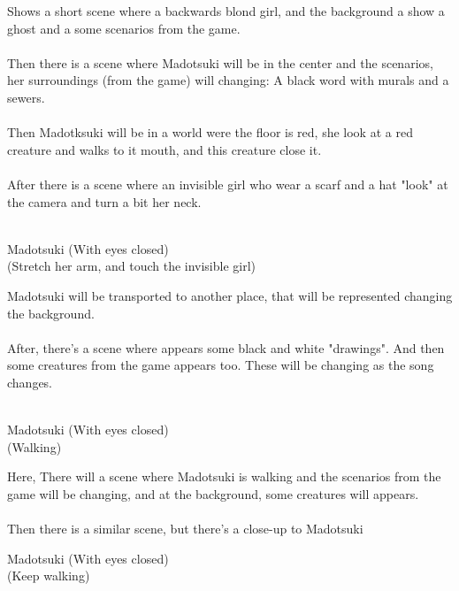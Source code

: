 \documentclass{screenplay}
\begin{document}
	Shows a short scene where a backwards blond girl, and the background a show a ghost and a some scenarios from the game.\\~\\
	
	Then there is a scene where Madotsuki will be in the center and the scenarios, her surroundings (from the game) will changing: A black word with murals and a sewers.\\~\\
	
	Then Madotksuki will be in a world were the floor is red, she look at a red creature and walks to it mouth, and this creature close it.\\~\\
	
	After there is a scene where an invisible girl who wear a scarf and a hat "look" at the camera and turn a bit her neck.\\~\\
	
	\begin{dialogue}{Madotsuki}
		(With eyes closed)\\
		(Stretch her arm, and touch the invisible girl)
	\end{dialogue}
	
	Madotsuki will be transported to another place, that will be represented changing the background.\\~\\
	
	After, there's a scene where appears some black and white "drawings". And then some creatures from the game appears too. These will be changing as the song changes.\\~\\
	
	\begin{dialogue}{Madotsuki}
		(With eyes closed)\\
		(Walking)
	\end{dialogue}
	Here, There will a scene where Madotsuki is walking and the scenarios from the game will be changing, and at the background, some creatures will appears.\\~\\
	Then there is a similar scene, but there's a close-up to Madotsuki
	\begin{dialogue}{Madotsuki}
		(With eyes closed)\\
		(Keep walking)
	\end{dialogue}
	
\end{document}
